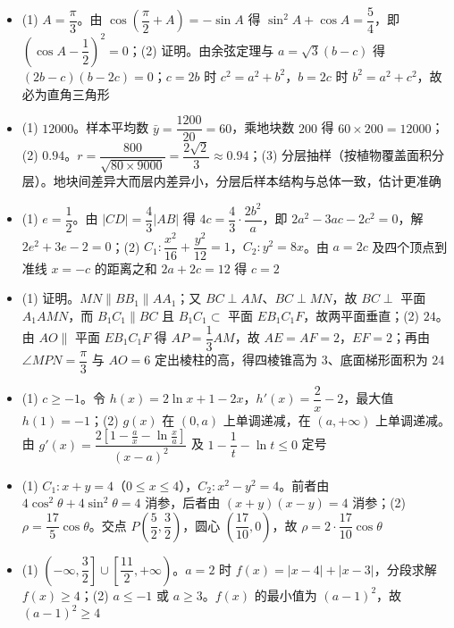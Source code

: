 \begin{itemize}[leftmargin=2.6em]
  \item[\textbf{17.}] (1) $A=\dfrac\pi3$。由 $\cos\left(\dfrac\pi2+A\right)=-\sin A$ 得 $\sin^2A+\cos A=\dfrac54$，即 $\left(\cos A-\dfrac12\right)^2=0$；(2) 证明。由余弦定理与 $a=\sqrt3(b-c)$ 得 $(2b-c)(b-2c)=0$；$c=2b$ 时 $c^2=a^2+b^2$，$b=2c$ 时 $b^2=a^2+c^2$，故必为直角三角形
  \item[\textbf{18.}] (1) $12000$。样本平均数 $\bar y=\dfrac{1200}{20}=60$，乘地块数 $200$ 得 $60\times200=12000$；(2) $0.94$。$r=\dfrac{800}{\sqrt{80\times9000}}=\dfrac{2\sqrt2}3\approx0.94$；(3) 分层抽样（按植物覆盖面积分层）。地块间差异大而层内差异小，分层后样本结构与总体一致，估计更准确
  \item[\textbf{19.}] (1) $e=\dfrac12$。由 $|CD|=\dfrac43|AB|$ 得 $4c=\dfrac43\cdot\dfrac{2b^2}a$，即 $2a^2-3ac-2c^2=0$，解 $2e^2+3e-2=0$；(2) $C_1:\dfrac{x^2}{16}+\dfrac{y^2}{12}=1$，$C_2:y^2=8x$。由 $a=2c$ 及四个顶点到准线 $x=-c$ 的距离之和 $2a+2c=12$ 得 $c=2$
  \item[\textbf{20.}] (1) 证明。$MN\parallel BB_1\parallel AA_1$；又 $BC\perp AM$、$BC\perp MN$，故 $BC\perp$ 平面 $A_1AMN$，而 $B_1C_1\parallel BC$ 且 $B_1C_1\subset$ 平面 $EB_1C_1F$，故两平面垂直；(2) $24$。由 $AO\parallel$ 平面 $EB_1C_1F$ 得 $AP=\dfrac13AM$，故 $AE=AF=2$，$EF=2$；再由 $\angle MPN=\dfrac\pi3$ 与 $AO=6$ 定出棱柱的高，得四棱锥高为 $3$、底面梯形面积为 $24$
  \item[\textbf{21.}] (1) $c\geqslant-1$。令 $h(x)=2\ln x+1-2x$，$h'(x)=\dfrac2x-2$，最大值 $h(1)=-1$；(2) $g(x)$ 在 $(0,a)$ 上单调递减，在 $(a,+\infty)$ 上单调递减。由 $g'(x)=\dfrac{2\left[1-\frac ax-\ln\frac xa\right]}{(x-a)^2}$ 及 $1-\dfrac1t-\ln t\leqslant0$ 定号
\end{itemize}

\begin{itemize}[leftmargin=2.6em]
  \item[\textbf{22.}] (1) $C_1:x+y=4$（$0\leqslant x\leqslant4$），$C_2:x^2-y^2=4$。前者由 $4\cos^2\theta+4\sin^2\theta=4$ 消参，后者由 $(x+y)(x-y)=4$ 消参；(2) $\rho=\dfrac{17}5\cos\theta$。交点 $P\left(\dfrac52,\dfrac32\right)$，圆心 $\left(\dfrac{17}{10},0\right)$，故 $\rho=2\cdot\dfrac{17}{10}\cos\theta$
  \item[\textbf{23.}] (1) $\left(-\infty,\dfrac32\right]\cup\left[\dfrac{11}2,+\infty\right)$。$a=2$ 时 $f(x)=|x-4|+|x-3|$，分段求解 $f(x)\geqslant4$；(2) $a\leqslant-1$ 或 $a\geqslant3$。$f(x)$ 的最小值为 $(a-1)^2$，故 $(a-1)^2\geqslant4$
\end{itemize}
